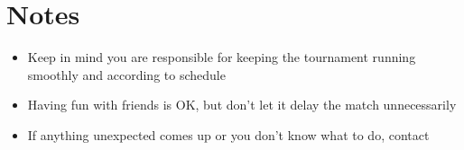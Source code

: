 \section*{Notes}

\begin{itemize}
	\item Keep in mind you are responsible for keeping the tournament running smoothly and according to schedule
	\item Having fun with friends is OK, but don't let it delay the match unnecessarily
	\item If anything unexpected comes up or you don't know what to do, contact 
\end{itemize}


